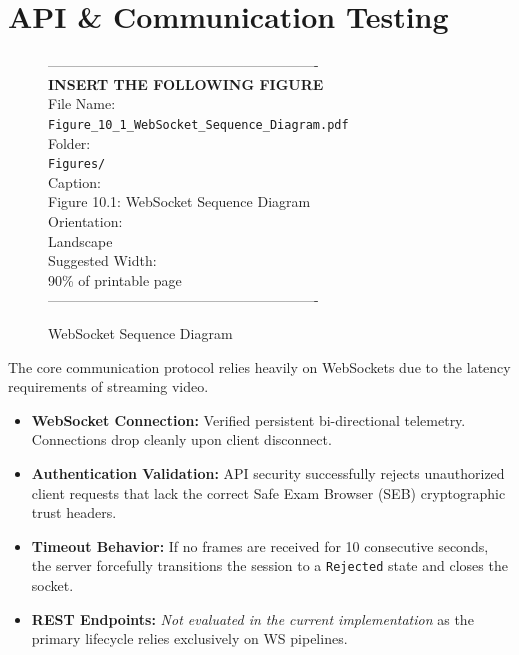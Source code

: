 \section{API \& Communication Testing}
\begin{figure}[htbp]
\begin{center}
----------------------------------------------------------\\
\vspace{0.5em}
\textbf{INSERT THE FOLLOWING FIGURE}\\
\vspace{1em}
File Name:\\
\texttt{Figure\_10\_1\_WebSocket\_Sequence\_Diagram.pdf}\\
\vspace{1em}
Folder:\\
\texttt{Figures/}\\
\vspace{1em}
Caption:\\
Figure 10.1: WebSocket Sequence Diagram\\
\vspace{1em}
Orientation:\\
Landscape\\
\vspace{1em}
Suggested Width:\\
90\% of printable page\\
\vspace{3cm}
----------------------------------------------------------
\end{center}
\caption{WebSocket Sequence Diagram}
\label{fig:diag_7}
\end{figure}
The core communication protocol relies heavily on WebSockets due to the latency requirements of streaming video.
\begin{itemize}
    \item \textbf{WebSocket Connection:} Verified persistent bi-directional telemetry. Connections drop cleanly upon client disconnect.
    \item \textbf{Authentication Validation:} API security successfully rejects unauthorized client requests that lack the correct Safe Exam Browser (SEB) cryptographic trust headers.
    \item \textbf{Timeout Behavior:} If no frames are received for 10 consecutive seconds, the server forcefully transitions the session to a \texttt{Rejected} state and closes the socket.
    \item \textbf{REST Endpoints:} \textit{Not evaluated in the current implementation} as the primary lifecycle relies exclusively on WS pipelines.
\end{itemize}

